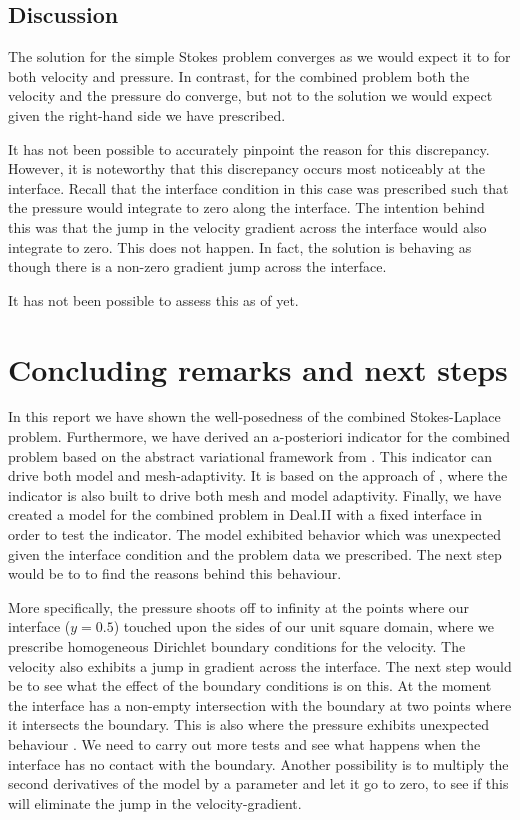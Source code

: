 \documentclass[12pt,a4paper]{article}
\theoremstyle{definition}
\begin{document}
\subsection{Discussion}\label{sec_dealii_discussion}
The solution for the simple Stokes problem converges as we would expect it to for both velocity and pressure.  In contrast, for the combined problem both the velocity and the pressure do converge, but not to the solution we would expect given the right-hand side we have prescribed. 


It has not been possible to accurately pinpoint the reason for this discrepancy.    However, it is noteworthy that this discrepancy occurs most noticeably at the interface.  Recall that the interface condition in this case was prescribed such that the pressure would integrate to zero along the interface.  The intention behind this was that the jump in the velocity gradient across the interface would also integrate to zero.  This does not happen.  In fact, the solution is behaving as though there is a non-zero gradient jump across the interface.  

It has not been possible to assess this as of yet.


\section{Concluding remarks and next steps}\label{sec_conclusion}
In this report we have shown the well-posedness of the combined Stokes-Laplace problem.  Furthermore, we have derived an a-posteriori indicator for the combined problem based on the abstract variational framework from \cite{verfurth2013posteriori}.  This indicator can drive both model and mesh-adaptivity.  It is based on the approach of \cite{giesselmann2017posteriori}, where the indicator is also built to drive both mesh and model adaptivity.  Finally, we have created a model  for the combined problem in Deal.II with a fixed interface in order to test the indicator.  The model exhibited  behavior which was unexpected given the interface condition and the problem data we prescribed.  The next step would be to to find the reasons behind this behaviour.  

More specifically, the pressure shoots off to infinity at the points where our interface ($y=0.5$) touched upon the sides of our unit square domain, where we prescribe homogeneous Dirichlet boundary conditions for the velocity.  The velocity also exhibits a jump in gradient across the interface.  The next step would be to see what the effect of the boundary conditions is on this.  At the moment the interface has a non-empty intersection with the boundary at  two points where it intersects the boundary.  This is also  where the pressure exhibits unexpected behaviour .   We need to carry out more tests and see what happens when the interface has no contact with the boundary.  Another possibility is to multiply the second derivatives of the model by a parameter and let it go to zero, to see if this will eliminate the jump in the velocity-gradient.  
\end{document}
